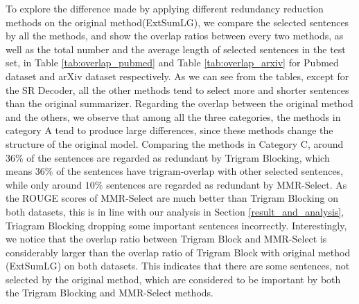 \documentclass[11pt,a4paper]{article}
\begin{document}
\begin{table*}[]
    \centering
    \caption{Micro overlap ratio (\%) between the selections of different methods and the total number and the average length of selected sentences in the test set of arXiv.}
    \label{tab:overlap_arxiv}
\end{table*}
To explore the difference made by applying different redundancy reduction methods on the original method(ExtSumLG), we compare the selected sentences by all the methods, and show the overlap ratios between every two methods, as well as the total number and the average length of selected sentences in the test set, in Table \ref{tab:overlap_pubmed} and Table \ref{tab:overlap_arxiv} for Pubmed dataset and arXiv dataset respectively. As we can see from the tables, except for the SR Decoder, all the other methods tend to select more and shorter sentences than the original summarizer. Regarding the overlap between the original method and the others, we observe that among all the three categories, the methods in category A tend to produce large differences, since these methods change the structure of the original model. Comparing the methods in Category C, around $36\%$ of the sentences are regarded as redundant by Trigram Blocking, which means $36\%$ of the sentences have trigram-overlap with other selected sentences, while only around $10\%$ sentences are regarded as redundant by MMR-Select. As the ROUGE scores of MMR-Select are much better than Trigram Blocking on both datasets, this is in line with our analysis in Section \ref{result_and_analysis}, Triagram Blocking dropping some important sentences incorrectly. Interestingly,
we notice that the overlap ratio between Trigram Block and MMR-Select is considerably larger than the overlap ratio of Trigram Block with original method (ExtSumLG) on both datasets. This indicates that there are some sentences, not selected by the original method, which are considered to be important by both the Trigram Blocking and MMR-Select methods.
\end{document}
